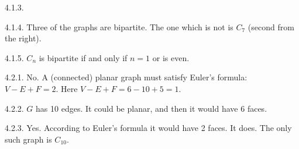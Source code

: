 \begin {itemize}
\begin{ans}{4.1.3.}
\end{ans}
\begin{ans}{4.1.4.}
		Three of the graphs are bipartite.  The one which is not is $C_7$ (second from the right).
	
\end{ans}
\begin{ans}{4.1.5.}
		$C_n$ is bipartite if and only if $n = 1$ or is even.
	
\end{ans}
\protect \end {itemize}
 \protect {} \protect \begin {itemize} 
\begin{ans}{4.2.1.}
		No.  A (connected) planar graph must satisfy Euler's formula: $V - E + F = 2$.  Here $V - E + F = 6 - 10 + 5 = 1$. %
	
\end{ans}
\begin{ans}{4.2.2.}
		$G$ has 10 edges.  It could be planar, and then it would have 6 faces. %
	
\end{ans}
\begin{ans}{4.2.3.}
		Yes.  According to Euler's formula it would have 2 faces.  It does.  The only such graph is $C_{10}$. %
	
\end{ans}
\protect \end {itemize}

